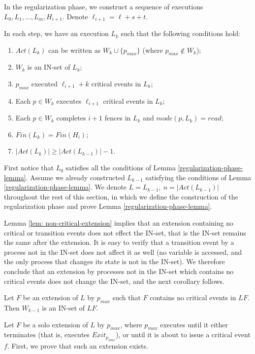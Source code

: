In the regularization phase, we construct a sequence of executions $L_0,L_1, \ldots, L_m, H_{i+1}$. Denote $\ell_{i+1} = \ell+s+t$.

\begin{lemma} \label{regularization-phase-lemma}
	In each step, we have an execution $L_k$ such that the following conditions hold:
	\begin{enumerate}[(1)]
		\item $Act(L_k)$ can be written as $W_k \cup \{p_{max}\}$ (where $p_{max} \notin W_k$);
		\item $W_k$ is an IN-set of $L_k$;
		\item $p_{max}$ executed $\ell_{i+1}+k$ critical events in $L_k$;
		\item Each $p \in W_k$ executes $\ell_{i+1}$ critical events in $L_k$;
		\item Each $p \in W_k$ completes $i+1$ fences in $L_k$ and $mode(p,L_k) = read$;
		\item $Fin(L_k) = Fin(H_i)$;
		\item $|Act(L_k)| \geq |Act(L_{k-1})|-1$.
	\end{enumerate}
\end{lemma}

First notice that $L_0$ satisfies all the conditions of Lemma \ref{regularization-phase-lemma}. Assume we already constructed $L_{k-1}$ satisfying the conditions of Lemma \ref{regularization-phase-lemma}. We denote $L=L_{k-1},\ n=|Act(L_{k-1})|$ throughout the rest of this section, in which we define the construction of the regularization phase and prove Lemma \ref{regularization-phase-lemma}.

Lemma \ref{lem: non-critical-extension} implies that an extension containing no critical or transition events does not effect the IN-set, that is the IN-set remains the same after the extension. It is easy to verify that a transition event by a process not in the IN-set does not affect it as well (no variable is accessed, and the only process that changes its state is not in the IN-set). We therefore conclude that an extension by processes not in the IN-set which contains no critical events does not change the IN-set, and the next corollary follows.
\begin{corollary} \label{claim: q-extension}
	Let $F$ be an extension of $L$ by $p_{max}$ such that $F$ contains no critical events in $L F$. Then $W_{k-1}$ is an IN-set of $L F$.
\end{corollary}

Let $F$ be a solo extension of $L$ by $p_{max}$, where $p_{max}$ executes until it either terminates (that is, executes $Exit_{p_{max}}$), or until it is about to issue a critical event $f$. First, we prove that such an extension exists.

